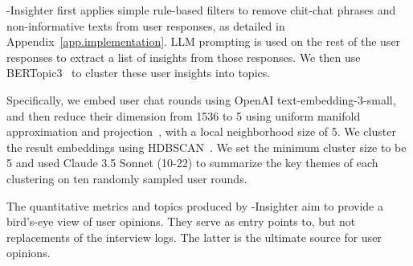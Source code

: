 

\method-Insighter first applies simple rule-based filters to remove chit-chat phrases and non-informative texts from user responses, as detailed in Appendix~\ref{app.implementation}. LLM prompting is used on the rest of the user responses to extract a list of insights from those responses. 
We then use BERTopic3~\cite{grootendorst2022bertopic} to cluster these user insights into topics.

Specifically, we embed user chat rounds using  OpenAI text-embedding-3-small, and then reduce their dimension from 1536 to 5 using uniform manifold approximation and projection~\cite{mcinnes2018umap}, with a local neighborhood size of 5. We cluster the result embeddings using HDBSCAN~\cite{malzer2020hybrid}.
We set the minimum cluster size to be 5 and used Claude 3.5 Sonnet (10-22) to summarize the key themes of each clustering on ten randomly sampled user rounds. 

The quantitative metrics and topics produced by \method-Insighter  aim to provide a bird's-eye view of user opinions. They serve as entry points to, but not replacements of the interview logs. The latter is the ultimate source for user opinions.